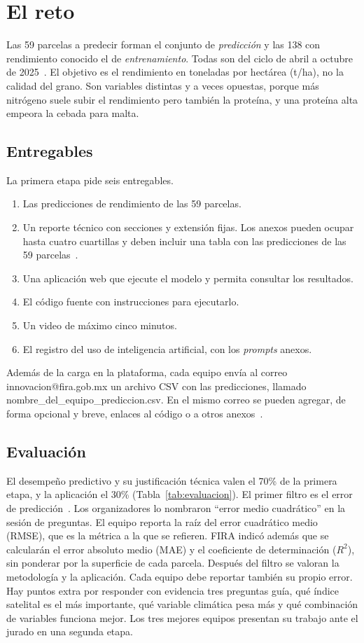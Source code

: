 \section{El reto}\label{sec:reto}
Las 59 parcelas a predecir forman el conjunto de \emph{predicción} y las 138 con rendimiento conocido el de
\emph{entrenamiento}. Todas son del ciclo de abril a octubre de 2025~\cite{bases}. El objetivo es el rendimiento en
toneladas por hectárea (t/ha), no la calidad del grano. Son variables distintas y a veces opuestas, porque más
nitrógeno suele subir el rendimiento pero también la proteína, y una proteína alta empeora la cebada para malta.

\subsection{Entregables}
La primera etapa pide seis entregables.
\begin{enumerate}
  \item Las predicciones de rendimiento de las 59 parcelas.
  \item Un reporte técnico con secciones y extensión fijas. Los anexos pueden ocupar hasta cuatro cuartillas y deben incluir una tabla con las predicciones de las 59 parcelas~\cite{preguntas}.
  \item Una aplicación web que ejecute el modelo y permita consultar los resultados.
  \item El código fuente con instrucciones para ejecutarlo.
  \item Un video de máximo cinco minutos.
  \item El registro del uso de inteligencia artificial, con los \emph{prompts} anexos.
\end{enumerate}
Además de la carga en la plataforma, cada equipo envía al correo innovacion@fira.gob.mx un archivo CSV con las predicciones, llamado nombre\_del\_equipo\_prediccion.csv. En el mismo correo se pueden agregar, de forma opcional y breve, enlaces al código o a otros anexos~\cite{preguntas}.

\subsection{Evaluación}
El desempeño predictivo y su justificación técnica valen el 70\% de la primera etapa, y la aplicación el 30\%
(Tabla~\ref{tab:evaluacion}). El primer filtro es el error de predicción~\cite{preguntas}. Los organizadores lo nombraron ``error medio cuadrático'' en la sesión de preguntas. El equipo reporta la raíz del error cuadrático medio (RMSE), que es la métrica a la que se refieren. FIRA indicó además que se calcularán el error absoluto medio (MAE) y el coeficiente de determinación ($R^2$), sin ponderar por la superficie de cada parcela. Después del filtro se valoran la metodología y la aplicación. Cada equipo debe reportar también su propio error. Hay puntos extra por responder con evidencia tres preguntas guía, qué índice satelital
es el más importante, qué variable climática pesa más y qué combinación de variables funciona mejor. Los tres mejores
equipos presentan su trabajo ante el jurado en una segunda etapa.

